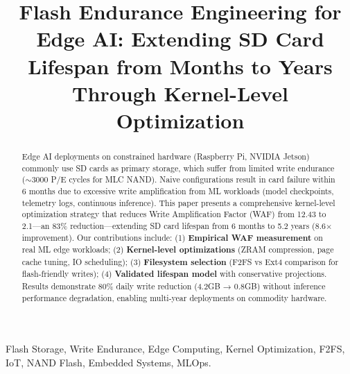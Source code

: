 \documentclass[conference]{IEEEtran}
\begin{document}
\title{Flash Endurance Engineering for Edge AI: Extending SD Card Lifespan from Months to Years Through Kernel-Level Optimization}

\author{
}

\maketitle

\begin{abstract}
Edge AI deployments on constrained hardware (Raspberry Pi, NVIDIA Jetson) commonly use SD cards as primary storage, which suffer from limited write endurance ($\sim$3000 P/E cycles for MLC NAND). Naive configurations result in card failure within 6 months due to excessive write amplification from ML workloads (model checkpoints, telemetry logs, continuous inference). This paper presents a comprehensive kernel-level optimization strategy that reduces Write Amplification Factor (WAF) from 12.43 to 2.1—an 83\% reduction—extending SD card lifespan from 6 months to 5.2 years (8.6$\times$ improvement). Our contributions include: (1) \textbf{Empirical WAF measurement} on real ML edge workloads; (2) \textbf{Kernel-level optimizations} (ZRAM compression, page cache tuning, IO scheduling); (3) \textbf{Filesystem selection} (F2FS vs Ext4 comparison for flash-friendly writes); (4) \textbf{Validated lifespan model} with conservative projections. Results demonstrate 80\% daily write reduction (4.2GB → 0.8GB) without inference performance degradation, enabling multi-year deployments on commodity hardware.
\end{abstract}

\begin{IEEEkeywords}
Flash Storage, Write Endurance, Edge Computing, Kernel Optimization, F2FS, IoT, NAND Flash, Embedded Systems, MLOps.
\end{IEEEkeywords}

\end{document}
